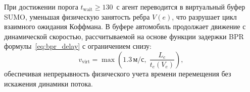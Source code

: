 При достижении порога $t_{\text{wait}} \ge 130$~с агент переводится в виртуальный буфер SUMO, уменьшая физическую занятость ребра $V(e)$, что разрушает цикл взаимного ожидания Коффмана. В буфере автомобиль продолжает движение с динамической скоростью, рассчитываемой на основе функции задержки BPR формулы~\eqref{eq:bpr_delay} с ограничением снизу:
\begin{equation}
v_{\text{virt}} = \max\left(1.3\,\text{м/с}, \; \frac{L_e}{t_e(V_e)}\right),
\label{eq:virtual_speed}
\end{equation}
обеспечивая непрерывность физического учета времени перемещения без искажения динамики потока.
